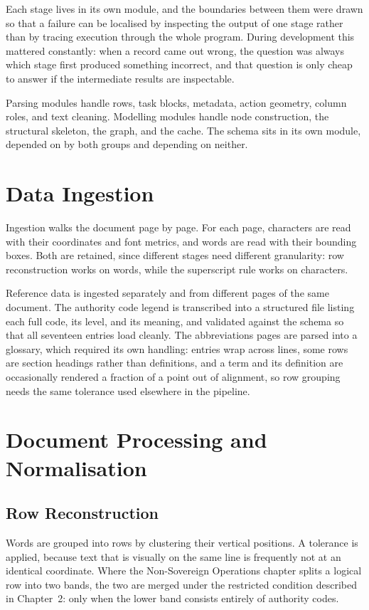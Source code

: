 Each stage lives in its own module, and the boundaries between them were drawn so that a failure can be localised by inspecting the output of one stage rather than by tracing execution through the whole program. During development this mattered constantly: when a record came out wrong, the question was always which stage first produced something incorrect, and that question is only cheap to answer if the intermediate results are inspectable.

Parsing modules handle rows, task blocks, metadata, action geometry, column roles, and text cleaning. Modelling modules handle node construction, the structural skeleton, the graph, and the cache. The schema sits in its own module, depended on by both groups and depending on neither.

\section{Data Ingestion}

Ingestion walks the document page by page. For each page, characters are read with their coordinates and font metrics, and words are read with their bounding boxes. Both are retained, since different stages need different granularity: row reconstruction works on words, while the superscript rule works on characters.

Reference data is ingested separately and from different pages of the same document. The authority code legend is transcribed into a structured file listing each full code, its level, and its meaning, and validated against the schema so that all seventeen entries load cleanly. The abbreviations pages are parsed into a glossary, which required its own handling: entries wrap across lines, some rows are section headings rather than definitions, and a term and its definition are occasionally rendered a fraction of a point out of alignment, so row grouping needs the same tolerance used elsewhere in the pipeline.

\section{Document Processing and Normalisation}

\subsection{Row Reconstruction}

Words are grouped into rows by clustering their vertical positions. A tolerance is applied, because text that is visually on the same line is frequently not at an identical coordinate. Where the Non-Sovereign Operations chapter splits a logical row into two bands, the two are merged under the restricted condition described in Chapter~2: only when the lower band consists entirely of authority codes.

